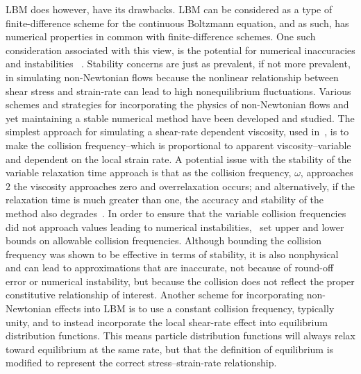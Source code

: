 \documentclass{article}
\begin{document}
LBM does however, have its drawbacks.
LBM can be considered as a type of finite-difference scheme for the continuous Boltzmann equation, and as such, has numerical properties in common with finite-difference schemes.
One such consideration associated with this view, is the potential for numerical inaccuracies and instabilities ~\cite{sterling1993stability,sterling1996stability,bawazeer2013stability,lallemand2000theory}. %
Stability concerns are just as prevalent, if not more prevalent, in simulating non-Newtonian flows because the nonlinear relationship between shear stress and strain-rate can lead to high nonequilibrium fluctuations. %
Various schemes and strategies for incorporating the physics of non-Newtonian flows and yet maintaining a stable numerical method have been developed and studied.
The simplest approach for simulating a shear-rate dependent viscosity, used in~\cite{boyd2006second,chen2014simulations,fallah2012multiple,tang2011bingham,svec2011flow,svec2012free}, is to make the collision frequency--which is proportional to apparent viscosity--variable and dependent on the local strain rate.
A potential issue with the stability of the variable relaxation time approach is that as the collision frequency, $\omega$, approaches $2$ the viscosity approaches zero and overrelaxation occurs; and alternatively, if the relaxation time is much greater than one, the accuracy and stability of the method also degrades~\cite{latt2007hydrodynamic}. %
In order to ensure that the variable collision frequencies did not approach values leading to numerical instabilities,~\cite{svec2011flow,svec2012free,gabbanelli2005lattice} set upper and lower bounds on allowable collision frequencies.
Although bounding the collision frequency was shown to be effective in terms of stability, it is also nonphysical and can lead to approximations that are inaccurate, not because of round-off error or numerical instability, but because the collision does not reflect the proper constitutive relationship of interest.
Another scheme for incorporating non-Newtonian effects into LBM is to use a constant collision frequency, typically unity, and to instead incorporate the local shear-rate effect into equilibrium distribution functions.
This means particle distribution functions will always relax toward equilibrium at the same rate, but that the definition of equilibrium is modified to represent the correct stress--strain-rate relationship.
\end{document}
